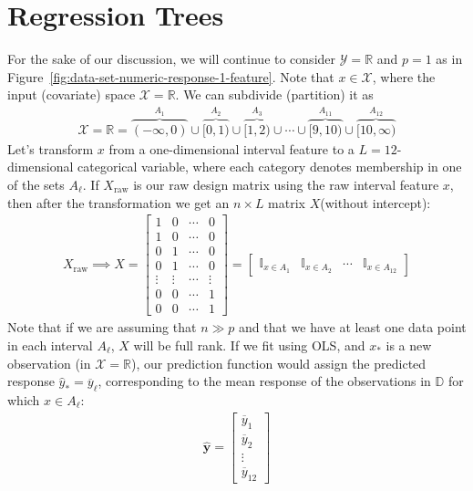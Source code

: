 \documentclass[12pt, a4paper]{article}
\theoremstyle{definition}
\begin{document}
	\section*{Regression Trees}
	For the sake of our discussion, we will continue to consider $\mathcal{Y}=\mathbb{R}$
	and $p=1$ as in Figure~\ref{fig:data-set-numeric-response-1-feature}. Note
	that $x\in \mathcal{X}$, where the input (covariate) space $\mathcal{X} = \mathbb{R}$.
	We can subdivide (partition) it as
	\begin{align*}
		\mathcal{X} = \mathbb{R} =
		\overbrace{(-\infty, 0)}^{A_1} \cup
		\overbrace{[0, 1)}^{A_2} \cup
		\overbrace{[1, 2)}^{A_3} \cup 
		\cdots \cup
		\overbrace{[9, 10)}^{A_{11}} \cup 
		\overbrace{[10, \infty)}^{A_{12}}
	\end{align*}
	Let's transform $x$ from a one-dimensional interval feature to
	a $L = 12$-dimensional categorical variable, where each category denotes
	membership in one of the sets $A_\ell$. If $X_{\text{raw}}$ is our raw design
	matrix using the raw interval feature $x$, then after the transformation
	we get an $n\times L$ matrix $X$(without intercept):
	\begin{align*}
		X_{\text{raw}}\implies
		X = \begin{bmatrix}
			1 & 0 & \cdots & 0\\
			1 & 0 & \cdots & 0\\
			0 & 1 & \cdots & 0\\
			0 & 1 & \cdots & 0\\
			\vdots& \vdots & \cdots& \vdots\\
			0 & 0 & \cdots& 1\\
			0 & 0 & \cdots & 1
		\end{bmatrix} = \begin{bmatrix}
		\mathbb{I}_{x\in A_1} & \mathbb{I}_{x\in A_2} & \cdots & \mathbb{I}_{x\in A_{12}}
		\end{bmatrix}
	\end{align*}
	Note that if we are assuming that $n \gg p$ and that we have at least one data point in each
	interval $A_\ell$, $X$ will be full rank. If we fit using OLS, and $x_*$
	is a new observation (in $\mathcal{X}=\mathbb{R}$), our prediction function
	would assign the predicted response $\hat{y}_* = \overline{y}_\ell$,
	corresponding to the mean response of the observations in $\mathbb{D}$
	for which $x\in A_\ell$:
	\begin{align*}
		\hat{\bm{y}} = \begin{bmatrix}
			\overline{y}_1\\
			\overline{y}_2\\
			\vdots\\
			\overline{y}_{12}
		\end{bmatrix}
	\end{align*}
\end{document}
